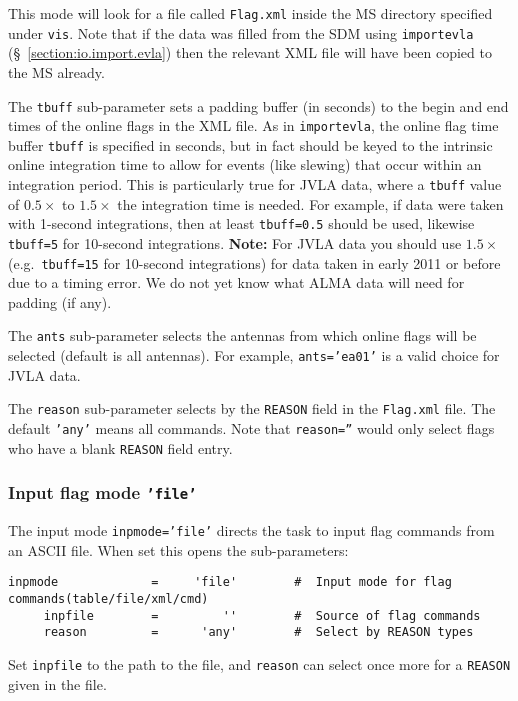 This mode will look for a file called {\tt Flag.xml} inside the MS
directory specified under {\tt vis}.  Note that if the data was filled
from the SDM using {\tt importevla} (\S~\ref{section:io.import.evla})
then the relevant XML file will have been copied to the MS already.

The {\tt tbuff} sub-parameter sets a padding buffer (in seconds)
to the begin and end times of the online flags in the XML file.
As in {\tt importevla}, the online flag time buffer {\tt tbuff} is specified in
seconds, but in fact should be keyed to the intrinsic online 
integration time to allow for events (like slewing) that occur
within an integration period.  This is particularly true for JVLA data,
where a {\tt tbuff} value of $0.5\times$ to $1.5\times$ the
integration time is needed.  For example, if data were taken with
1-second integrations, then at least {\tt tbuff=0.5} should be used,
likewise {\tt tbuff=5} for 10-second integrations.
{\bf Note:} For JVLA data you should use $1.5\times$ (e.g.\ 
{\tt tbuff=15} for 10-second integrations) for data taken in 
early 2011 or before due to a timing error.  We do not yet know what
ALMA data will need for padding (if any).

The {\tt ants} sub-parameter selects the antennas from which
online flags will be selected (default is all antennas).  For example,
{\tt ants='ea01'} is a valid choice for JVLA data.

The {\tt reason} sub-parameter selects by the {\tt REASON} field in
the {\tt Flag.xml} file.  The default {\tt 'any'} means all commands.
Note that {\tt reason=''} would only select flags who have a blank {\tt REASON}
field entry.

\subsubsection{Input flag mode {\tt 'file'}}
\label{section:edit.flagcmd.inpmode.file}

The input mode {\tt inpmode='file'} directs the
task to input flag commands from an ASCII file.  
When set this opens the sub-parameters:
\small
\begin{verbatim}
inpmode             =     'file'        #  Input mode for flag commands(table/file/xml/cmd)
     inpfile        =         ''        #  Source of flag commands
     reason         =      'any'        #  Select by REASON types
\end{verbatim}
\normalsize
Set {\tt inpfile} to the path to the file, and {\tt reason} can select
once more for a {\tt REASON} given in the file. 

